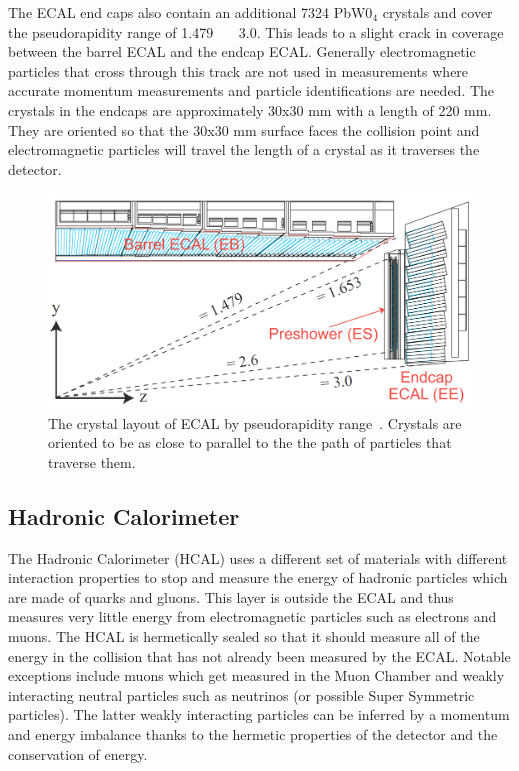 	The ECAL end caps also contain an additional 7324 PbW0$_4$ crystals and cover the pseudorapidity range of 1.479 \lt \ \abseta \ \lt \ 3.0. This leads to a slight crack in coverage between the barrel ECAL and the endcap ECAL. Generally electromagnetic particles that cross through this track are not used in measurements where accurate momentum measurements and particle identifications are needed. The crystals in the endcaps are approximately 30x30 mm with a length of 220 mm. They are oriented so that the 30x30 mm surface faces the collision point and electromagnetic particles will travel the length of a crystal as it traverses the detector.
	 
	 
						\begin{figure}[h]
\begin{center}
\includegraphics[width=0.9\linewidth]{Figs/ECAL_layout.png}
\caption{\label{fig:ecal}
The crystal layout of ECAL by pseudorapidity range~\cite{tdr1}. Crystals are oriented to be as close to parallel to the the path of particles that traverse them.
}
\end{center}
\end{figure}
	
	\subsection{Hadronic Calorimeter}
	\label{sec:hadronic_calorimeter}
	The Hadronic Calorimeter (HCAL) uses a different set of materials with different interaction properties to stop and measure the energy of hadronic particles which are made of quarks and gluons. This layer is outside the ECAL and thus measures very little energy from electromagnetic particles such as electrons and muons. The HCAL is hermetically sealed so that it should measure all of the energy in the collision that has not already been measured by the ECAL. Notable exceptions include muons which get measured in the Muon Chamber and weakly interacting neutral particles such as neutrinos (or possible Super Symmetric particles). The latter weakly interacting particles can be inferred by a momentum and energy imbalance thanks to the hermetic properties of the detector and the conservation of energy.\\
	
